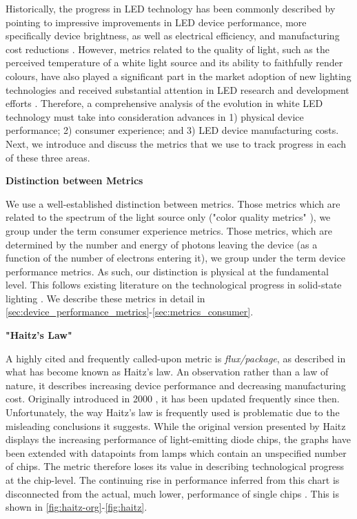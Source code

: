\documentclass[parskip=full]{article}
\begin{document}
Historically, the progress in LED technology has been commonly described by pointing to impressive improvements in LED device performance, more specifically device brightness, as well as electrical efficiency, and manufacturing cost reductions \cite{Taki2019}. However, metrics related to the quality of light, such as the perceived temperature of a white light source and its ability to faithfully render colours, have also played a significant part in the market adoption of new lighting technologies \cite{Menanteau2000,Sandahl2006,CAIRD2008,murphy2012governing} and received substantial attention in LED research and development efforts \cite{azevedo2009transition,cho2017white}. Therefore, a comprehensive analysis of the evolution in white LED technology must take into consideration advances in 1) physical device performance; 2) consumer experience; and 3) LED device manufacturing costs. Next, we introduce and discuss the metrics that we use to track progress in each of these three areas.

\textbf{Distinction between Metrics}

We use a well-established distinction between metrics. Those metrics which are related to the spectrum of the light source only ("color quality metrics" \cite{DLC_SSL_Requirements}\cite{dilaura2011lighting}), we group under the term consumer experience metrics. Those metrics, which are determined by the number and energy of photons leaving the device (as a function of the number of electrons entering it), we group under the term device performance metrics. As such, our distinction is physical at the fundamental level. This follows existing literature on the technological progress in solid-state lighting \cite{tsao2010solid}. We describe these metrics in detail in \cref{sec:device_performance_metrics}-\cref{sec:metrics_consumer}.

\textbf{"Haitz's Law"}

A highly cited and frequently called-upon metric is \textit{flux/package}, as described in what has become known as Haitz's law. An observation rather than a law of nature, it describes increasing device performance and decreasing manufacturing cost. Originally introduced in 2000 \cite{haitz1999case}, it has been updated frequently since then. Unfortunately, the way Haitz's law is frequently used is  problematic due to the misleading conclusions it suggests. While the original version presented by Haitz displays the increasing performance of light-emitting diode chips, the graphs have been extended with datapoints from lamps which contain an unspecified number of chips. The metric therefore loses its value in describing technological progress at the chip-level. The continuing rise in performance inferred from this chart is disconnected from the actual, much lower, performance of single chips \cite{weinold2021compound}. This is shown in \cref{fig:haitz-org}-\cref{fig:haitz}.
\end{document}
